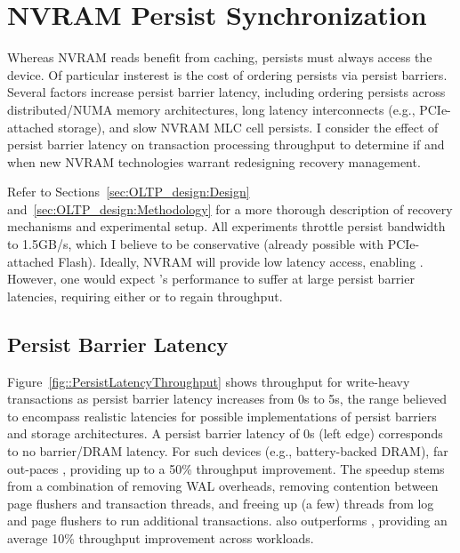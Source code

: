 \section{NVRAM Persist Synchronization}
\label{sec:OLTP_eval:Persists}

Whereas NVRAM reads benefit from caching, persists must always access the device.
Of particular insterest is the cost of ordering persists via persist barriers.
Several factors increase persist barrier latency, including ordering persists across distributed/NUMA memory architectures, long latency interconnects (e.g., PCIe-attached storage), and slow NVRAM MLC cell persists.
I consider the effect of persist barrier latency on transaction processing throughput to determine if and when new NVRAM technologies warrant redesigning recovery management.

Refer to Sections~\ref{sec:OLTP_design:Design} and~\ref{sec:OLTP_design:Methodology} for a more thorough description of recovery mechanisms and experimental setup.
All experiments throttle persist bandwidth to 1.5GB/s, which I believe to be conservative (already possible with PCIe-attached Flash).
Ideally, NVRAM will provide low latency access, enabling \InPlace.
However, one would expect \InPlace's performance to suffer at large persist barrier latencies, requiring either \NVDisk or \GroupCommit to regain throughput.

\subsection{Persist Barrier Latency}
\label{sec:OLTP_eval:Persists:Performance}



Figure~\ref{fig::PersistLatencyThroughput} shows throughput for write-heavy transactions as persist barrier latency increases from 0\textmu s to 5\textmu s, the range believed to encompass realistic latencies for possible implementations of persist barriers and storage architectures.
A persist barrier latency of 0\textmu s (left edge) corresponds to no barrier/DRAM latency.
For such devices (e.g., battery-backed DRAM), \InPlace far out-paces \NVDisk, providing up to a 50\% throughput improvement.
The speedup stems from a combination of removing WAL overheads, removing contention between page flushers and transaction threads, and freeing up (a few) threads from log and page flushers to run additional transactions.
\InPlace also outperforms \GroupCommit, providing an average 10\% throughput improvement across workloads.

